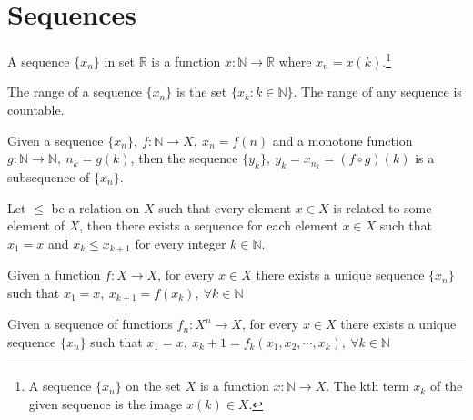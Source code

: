 \section{Sequences}
	\begin{definition}
		A sequence $\{x_n\}$ in set $\mathbb{R}$ is a function $x: \mathbb{N} \to \mathbb{R}$ where $x_n = x(k)$.\footnote{A sequence $\{x_n\}$ on the set $X$ is a function $x:\mathbb{N} \to X$. The kth term $x_k$ of the given sequence is the image $x(k) \in X$.}
	\end{definition}
	\begin{definition}
		The range of a sequence $\{x_n\}$ is the set $\{ x_k : k \in \mathbb{N} \}$. The range of any sequence is countable.
	\end{definition}
	\begin{definition}
		Given a sequence $\{x_n\},\ f:\mathbb{N} \to X,\ x_n = f(n)$ and a monotone function $g:\mathbb{N} \to \mathbb{N},\ n_k = g(k)$, then the sequence $\{y_k\},\ y_k = x_{n_k} = (f \circ g)(k)$ is a subsequence of $\{x_n\}$.
	\end{definition}
	\begin{axiom}
		Let $\le$ be a relation on $X$ such that every element $x \in X$ is related to some element of $X$, then there exists a sequence for each element $x \in X$ such that $x_1 = x$ and $x_k \le x_{k+1}$ for every integer $k \in \mathbb{N}$.\cite{khar1}
	\end{axiom}
	\begin{theorem}
		Given a function $f:X \to X$, for every $x \in X$ there exists a unique sequence $\{x_n\}$ such that $x_1 = x,\ x_{k+1} = f(x_k),\ \forall k \in \mathbb{N}$
	\end{theorem}
	\begin{corollary}
		Given a sequence of functions $f_n : X^n \to X$, for every $x \in X$ there exists a unique sequence $\{x_n\}$ such that $x_1 = x,\ x_k+1 = f_k(x_1,x_2,\cdots,x_k),\ \forall k \in \mathbb{N}$
	\end{corollary}

